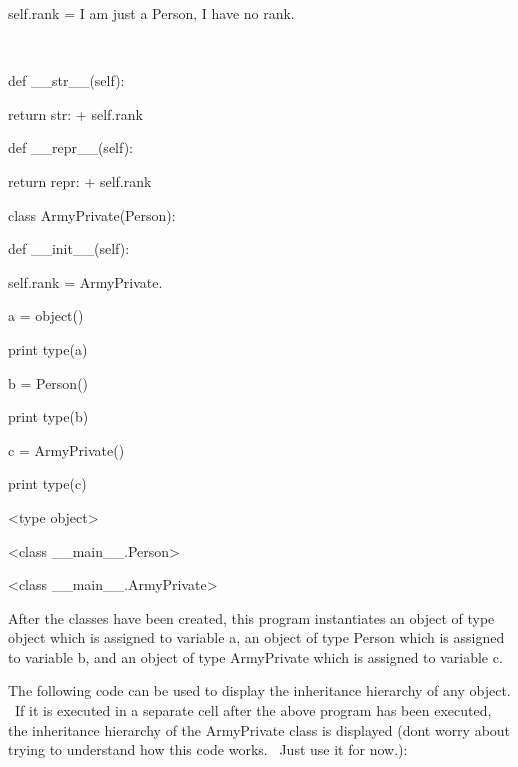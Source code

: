 \documentclass[12pt,twoside]{book}
\begin{document}
  self.rank = {\textquotedbl}I am just a Person, I have no
rank.{\textquotedbl}

\ \ 

 def \_\_str\_\_(self):

  return {\textquotedbl}str: {\textquotedbl} + self.rank

  

 def \_\_repr\_\_(self):

  return {\textquotedbl}repr: {\textquotedbl} + self.rank


\bigskip


\bigskip

class ArmyPrivate(Person):

 def \_\_init\_\_(self):

  self.rank = {\textquotedbl}ArmyPrivate.{\textquotedbl}


\bigskip


\bigskip

a = object()

print type(a)



b = Person()

print type(b)


\bigskip

c = ArmyPrivate()

print type(c)

{\textbar}

{\textless}type {\textquotesingle}object{\textquotesingle}{\textgreater}

{\textless}class
{\textquotesingle}\_\_main\_\_.Person{\textquotesingle}{\textgreater}

{\textless}class
{\textquotesingle}\_\_main\_\_.ArmyPrivate{\textquotesingle}{\textgreater}


\bigskip


\bigskip

After the classes have been created, this program instantiates an object
of type object which is assigned to variable
{\textquotesingle}a{\textquotesingle}, an object of type Person which
is assigned to variable {\textquotesingle}b{\textquotesingle}, and an
object of type ArmyPrivate which is assigned to variable
{\textquotesingle}c{\textquotesingle}.


\bigskip

The following code can be used to display the inheritance hierarchy of
any object. \ If it is executed in a separate cell after the above
program has been executed, the inheritance hierarchy of the ArmyPrivate
class is displayed (don{\textquotesingle}t worry about trying to
understand how this code works. \ Just use it for now.):
\end{document}
